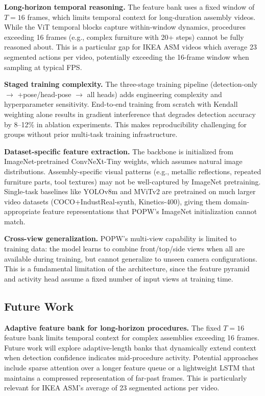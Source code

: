 \documentclass[11pt,a4paper]{article}
\begin{document}
\textbf{Long-horizon temporal reasoning.} The feature bank uses a fixed window of $T=16$ frames, which limits temporal context for long-duration assembly videos. While the ViT temporal blocks capture within-window dynamics, procedures exceeding 16 frames (e.g., complex furniture with 20+ steps) cannot be fully reasoned about. This is a particular gap for IKEA ASM videos which average 23 segmented actions per video, potentially exceeding the 16-frame window when sampling at typical FPS.

\textbf{Staged training complexity.} The three-stage training pipeline (detection-only $\rightarrow$ +pose/head-pose $\rightarrow$ all heads) adds engineering complexity and hyperparameter sensitivity. End-to-end training from scratch with Kendall weighting alone results in gradient interference that degrades detection accuracy by 8--12\% in ablation experiments. This makes reproducibility challenging for groups without prior multi-task training infrastructure.

\textbf{Dataset-specific feature extraction.} The backbone is initialized from ImageNet-pretrained ConvNeXt-Tiny weights, which assumes natural image distributions. Assembly-specific visual patterns (e.g., metallic reflections, repeated furniture parts, tool textures) may not be well-captured by ImageNet pretraining. Single-task baselines like YOLOv8m and MViTv2 are pretrained on much larger video datasets (COCO+IndustReal-synth, Kinetics-400), giving them domain-appropriate feature representations that POPW's ImageNet initialization cannot match.

\textbf{Cross-view generalization.} POPW's multi-view capability is limited to training data: the model learns to combine front/top/side views when all are available during training, but cannot generalize to unseen camera configurations. This is a fundamental limitation of the architecture, since the feature pyramid and activity head assume a fixed number of input views at training time.

\subsection{Future Work}
\label{sec:future}

\textbf{Adaptive feature bank for long-horizon procedures.} The fixed $T=16$ feature bank limits temporal context for complex assemblies exceeding 16 frames. Future work will explore adaptive-length banks that dynamically extend context when detection confidence indicates mid-procedure activity. Potential approaches include sparse attention over a longer feature queue or a lightweight LSTM that maintains a compressed representation of far-past frames. This is particularly relevant for IKEA ASM's average of 23 segmented actions per video.
\end{document}
